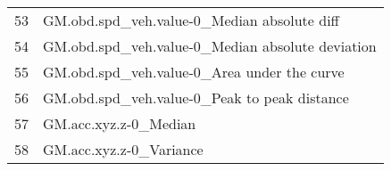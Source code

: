 \begin{tabular}{ll}
53 &       GM.obd.spd\_veh.value-0\_Median absolute diff \\
54 &  GM.obd.spd\_veh.value-0\_Median absolute deviation \\
55 &       GM.obd.spd\_veh.value-0\_Area under the curve \\
56 &      GM.obd.spd\_veh.value-0\_Peak to peak distance \\
57 &                             GM.acc.xyz.z-0\_Median \\
58 &                           GM.acc.xyz.z-0\_Variance \\
\bottomrule
\end{tabular}

